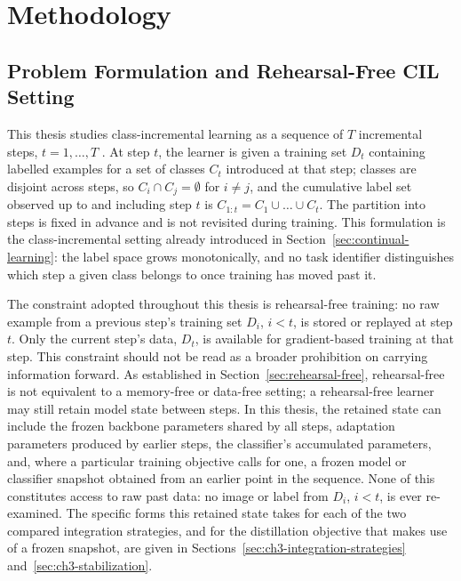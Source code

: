 \chapter{Methodology}
\label{ch:methodology}

\section{Problem Formulation and Rehearsal-Free CIL Setting}
\label{sec:ch3-problem-formulation}

This thesis studies class-incremental learning as a sequence of $T$
incremental steps, $t = 1, \dots, T$ \parencite{delange2022continual}. At step $t$,
the learner is given a training set $D_t$ containing labelled examples for
a set of classes $C_t$ introduced at that step; classes are disjoint across
steps, so $C_i \cap C_j = \emptyset$ for $i \neq j$, and the cumulative
label set observed up to and including step $t$ is $C_{1:t} = C_1 \cup
\dots \cup C_t$. The partition into steps is fixed in advance and is not
revisited during training. This formulation is the class-incremental
setting already introduced in Section~\ref{sec:continual-learning}: the label space grows
monotonically, and no task identifier distinguishes which step a given
class belongs to once training has moved past it.

The constraint adopted throughout this thesis is rehearsal-free training:
no raw example from a previous step's training set $D_i$, $i<t$, is stored
or replayed at step $t$. Only the current step's data, $D_t$, is available
for gradient-based training at that step. This constraint should not be
read as a broader prohibition on carrying information forward. As
established in Section~\ref{sec:rehearsal-free}, rehearsal-free is not equivalent to a
memory-free or data-free setting; a rehearsal-free learner may still retain
model state between steps. In this thesis, the retained state can include
the frozen backbone parameters shared by all steps, adaptation parameters
produced by earlier steps, the classifier's accumulated parameters, and,
where a particular training objective calls for one, a frozen model or
classifier snapshot obtained from an earlier point in the sequence. None of
this constitutes access to raw past data: no image or label from $D_i$,
$i<t$, is ever re-examined. The specific forms this retained state takes
for each of the two compared integration strategies, and for the
distillation objective that makes use of a frozen snapshot, are given in
Sections~\ref{sec:ch3-integration-strategies} and~\ref{sec:ch3-stabilization}.

